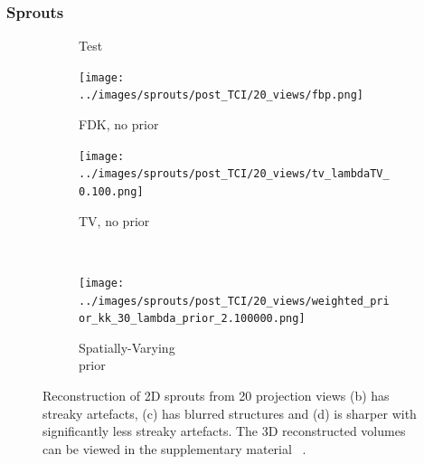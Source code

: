 \documentclass[journal]{IEEEtran}
\begin{document}
\subsubsection{\textbf{Sprouts}}
\label{Sec:sprouts_spatially_varying}
\begin{figure}[!h]
    \begin{subfigure}[b]{0.29\linewidth}
        \caption{Test}
     \end{subfigure}
\quad
    \begin{subfigure}[b]{0.3\linewidth}
        \texttt{[image: ../images/sprouts/post\_TCI/20\_views/fbp.png]}
        \caption{FDK, no prior}
    \end{subfigure}
\quad
    \begin{subfigure}[b]{0.3\linewidth}
        \texttt{[image: ../images/sprouts/post\_TCI/20\_views/tv\_lambdaTV\_0.100.png]}
        \caption{TV, no prior}
     \end{subfigure}\\
\quad
    \begin{subfigure}[b]{0.3\linewidth}
        \texttt{[image: ../images/sprouts/post\_TCI/20\_views/weighted\_prior\_kk\_30\_lambda\_prior\_2.100000.png]}
        \caption{Spatially-Varying\\ prior}
    \end{subfigure}
     \caption{Reconstruction of 2D sprouts from 20 projection views
   (b) has streaky artefacts, (c) has blurred structures and (d) is sharper with significantly less streaky artefacts. The 3D reconstructed volumes can be viewed  in the supplementary material ~\cite{supp_paper}.} 
\label{fig:sprouts_3D_results}
\end{figure}
\end{document}
